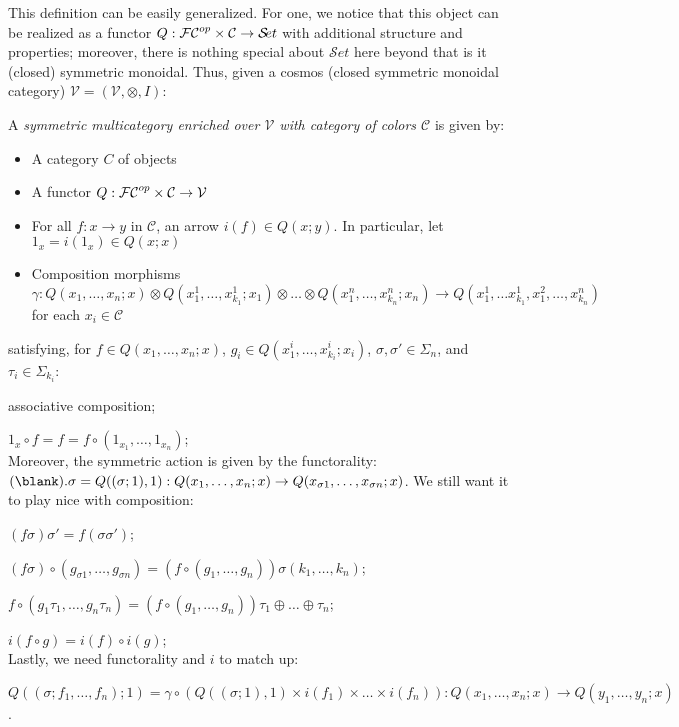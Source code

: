 \documentclass{report}
\newenvironment{renumerate}
{\begin{list}{\roman{enumi}.}
    {\itemsep=0in\usecounter{enumi}}
  }{\end{list}}
\newcommand{\Set}{\text{$\mathcal{S}\!et$}}
\renewcommand{\C}{\text{$\mathcal{C}$}}
\newcommand{\V}{\text{$\mathcal{V}$}}
\begin{document}
This definition can be easily generalized. For one, we notice that this object can be realized as a functor $Q: \F\C^{op}\times\C\to \Set$ with additional structure and properties; moreover, there is nothing special about $\Set$ here beyond that is it (closed) symmetric monoidal. Thus, given a cosmos (closed symmetric monoidal category) $\V = (\V,\otimes, I)$:
\begin{defn}
  A {\em symmetric multicategory enriched over $\V$ with category of colors $\C$} is given by:
 \begin{itemize}\itemsep-4pt
  \item A category $C$ of objects
  \item A functor $Q: \F\C^{op}\times \C\to \V$
  \item For all $f: x\to y$ in $\C$, an arrow $i(f)\in Q(x;y)$. In particular, let $1_x = i(1_x)\in Q(x;x)$
  \item Composition morphisms $\gamma:Q(x_1,\ldots, x_n;x)\otimes Q(x_1^1,\ldots, x_{k_1}^1; x_1)\otimes\ldots\otimes Q(x_1^n,\ldots,x_{k_n}^n;x_n) \to Q(x_1^1,\ldots x_{k_1}^1,x_1^2,\ldots, x_{k_n}^n)$ for each $x_i\in \C$
  \end{itemize}
satisfying, for  $f\in Q(x_1,\ldots, x_n;x)$, $g_i\in Q(x_1^i,\ldots, x_{k_i}^i;x_i)$, $\sigma,\sigma'\in\Sigma_n$, and $\tau_i\in \Sigma_{k_i}$:
\begin{renumerate}\itemsep-4pt
\item associative composition;
\item $1_x\circ f = f = f\circ (1_{x_1}, \ldots, 1_{x_n})$;\\
Moreover, the symmetric action is given by the functorality: $(\blank).\sigma = Q((\sigma;1),1): Q(x_1,\ldots, x_n;x)\to Q(x_{\sigma 1},\ldots, x_{\sigma n};x)$. We still want it to play nice with composition:
\item $(f\sigma)\sigma' = f(\sigma\sigma')$;
\item $(f\sigma)\circ (g_{\sigma 1},\ldots,g_{\sigma n})=(f\circ (g_1,\ldots, g_n))\sigma(k_1,\ldots, k_n)$;
\item $f\circ (g_1\tau_1,\ldots, g_n\tau_n) = (f\circ (g_1,\ldots, g_n))\tau_1\oplus\ldots\oplus\tau_n$;
\item $i(f\circ g) = i(f)\circ i(g)$;\\
Lastly, we need functorality and $i$ to match up:
\item $Q((\sigma;f_1,\ldots, f_n);1) = \gamma\circ (Q((\sigma;1),1)\times i(f_1)\times\ldots \times i(f_n)): Q(x_1,\ldots, x_n;x)\to Q(y_1,\ldots, y_n; x)$.
\end{renumerate}
\end{defn}
\end{document}

